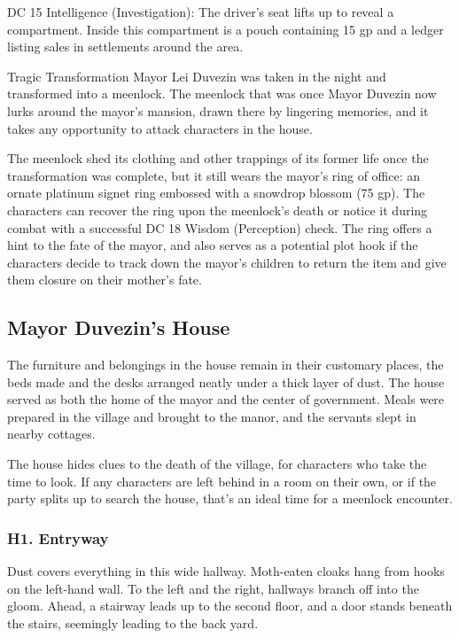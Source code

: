 \documentclass[10pt,a4paper,twoside,bg=print,twocolumn,openany,nodeprecatedcode]{dndbook}
\begin{document}
DC 15 Intelligence (Investigation): The driver's seat lifts up to reveal a compartment. Inside this compartment is a pouch containing 15 gp and a ledger listing sales in settlements around the area.

\begin{DndSidebar}[float=!b]{Tragic Transformation}
Mayor Lei Duvezin was taken in the night and transformed into a meenlock. The meenlock that was once Mayor Duvezin now lurks around the mayor's mansion, drawn there by lingering memories, and it takes any opportunity to attack characters in the house.



The meenlock shed its clothing and other trappings of its former life once the transformation was complete, but it still wears the mayor's ring of office: an ornate platinum signet ring embossed with a snowdrop blossom (75 gp). The characters can recover the ring upon the meenlock's death or notice it during combat with a successful DC 18 Wisdom (Perception) check. The ring offers a hint to the fate of the mayor, and also serves as a potential plot hook if the characters decide to track down the mayor's children to return the item and give them closure on their mother's fate.



\end{DndSidebar}

\subsection{Mayor Duvezin's House}
The furniture and belongings in the house remain in their customary places, the beds made and the desks arranged neatly under a thick layer of dust. The house served as both the home of the mayor and the center of government. Meals were prepared in the village and brought to the manor, and the servants slept in nearby cottages.

The house hides clues to the death of the village, for characters who take the time to look. If any characters are left behind in a room on their own, or if the party splits up to search the house, that's an ideal time for a meenlock encounter.

\subsubsection{H1. Entryway}
\begin{DndReadAloud}{}
Dust covers everything in this wide hallway. Moth-eaten cloaks hang from hooks on the left-hand wall. To the left and the right, hallways branch off into the gloom. Ahead, a stairway leads up to the second floor, and a door stands beneath the stairs, seemingly leading to the back yard.

\end{DndReadAloud}
\end{document}
